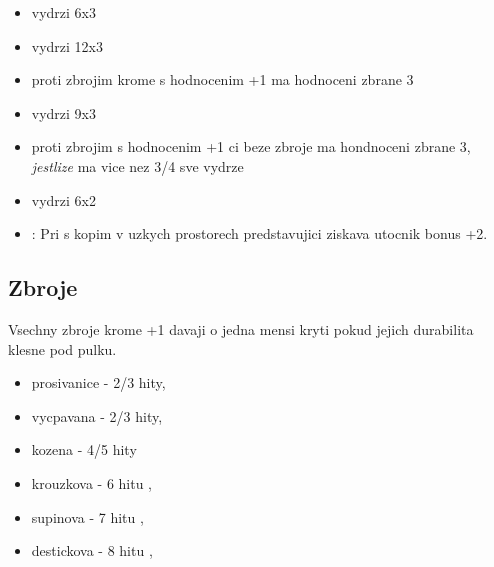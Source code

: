 \begin{Predmet}[Sekera]
\begin{itemize}
  \item vydrzi 6x3
\end{itemize}
\end{Predmet}

\begin{Predmet}[Palcát]
\begin{itemize}
	\item vydrzi 12x3
	\item proti zbrojim krome s hodnocenim +1 ma hodnoceni zbrane 3
\end{itemize}
\end{Predmet}

\begin{Predmet}[Meč]
\begin{itemize}
	\item vydrzi 9x3
	\item proti zbrojim s hodnocenim +1 ci beze zbroje ma hondnoceni zbrane 3, \emph{jestlize} ma vice nez 3/4 sve vydrze
\end{itemize}
\end{Predmet}


\begin{Predmet}[Kopí]
\begin{itemize}
	\item vydrzi 6x2
	\item {}: Pri  s kopim v uzkych prostorech predstavujici  ziskava utocnik bonus +2.
\end{itemize}
\end{Predmet}
\subsection{Zbroje}
\label{sec:zbroje}

Vsechny zbroje krome +1 davaji o jedna mensi kryti pokud jejich durabilita klesne pod pulku.

\begin{Predmet}
\begin{itemize}
	\item prosivanice - 2/3 hity,
	\item vycpavana - 2/3 hity,
	\item kozena - 4/5 hity
\end{itemize}
\end{Predmet}

\begin{Predmet}
\begin{itemize}
	\item krouzkova - 6 hitu ,
	\item supinova - 7 hitu ,
	\item destickova - 8 hitu ,
\end{itemize}
\end{Predmet}

